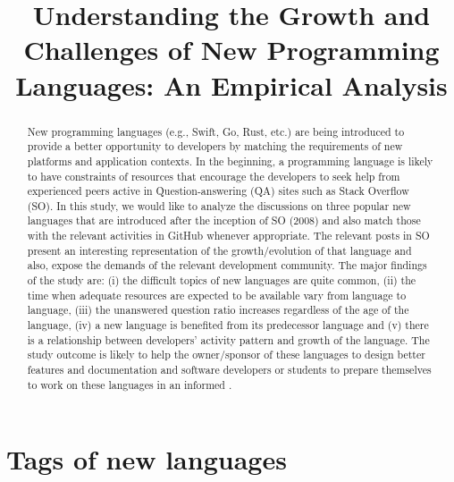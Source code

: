 \documentclass[acmsmall]{acmart}
\title{
Understanding the Growth and Challenges of New Programming Languages: An Empirical Analysis
}
\begin{document}
\newcommand{\rcomment}[1] { \textcolor{red}{#1}}
\newcommand{\boxtext}[1]{\begin{longfbox}#1\end{longfbox}}
\newcommand{\eqrow}[1]{
    \vbox{
        \begin{equation}
            \nonumber
            \begin{split}
                #1 \hspace{10em}
            \end{split}
        \end{equation}
        } \\
     }

\begin{abstract}
New programming languages (e.g., Swift, Go, Rust, etc.) are being introduced to provide a better opportunity to developers by matching the requirements of new platforms and application contexts. In the beginning, a programming language is likely to have constraints of resources that encourage the developers to seek help from experienced peers active in Question-answering (QA) sites such as Stack Overflow (SO). In this study, we would like to analyze the discussions on three popular new languages that are introduced after the inception of SO (2008) and also match those with the relevant activities in GitHub whenever appropriate. The relevant posts in SO present an interesting representation of the growth/evolution of that language and also, expose the demands of the relevant development community. The major findings of the study are: (i) the difficult topics of new languages are quite common, (ii) the time when adequate resources are expected to be available vary from language to language, (iii) the unanswered question ratio increases regardless of the age of the language, (iv) a new language is benefited from its predecessor language and (v) there is a relationship between developers' activity pattern and growth of the language. The study outcome is likely to help the owner/sponsor of these languages to design better features and documentation and software developers or students to prepare themselves to work on these languages in an informed  .
\end{abstract}
\maketitle














\pagebreak
\appendix
\section{Tags of new languages}
\label{appendix:tagrelevance}

    
\end{document}
